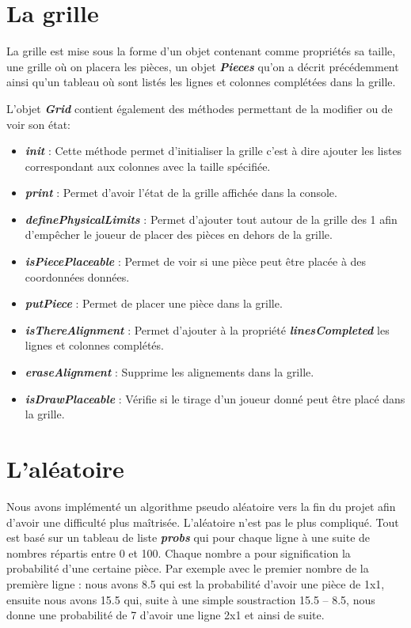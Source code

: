 \documentclass[a4paper]{report}
\begin{document}
\section{La grille}
La grille est mise sous la forme d'un objet contenant comme propriétés sa taille, une grille où on placera les pièces, un objet \textbf{\textit{Pieces}} qu'on a décrit précédemment ainsi qu'un tableau où sont listés les lignes et colonnes complétées dans la grille.

L'objet \textbf{\textit{Grid}} contient également des méthodes permettant de la modifier ou de voir son état:
\begin{itemize}
	\item \textbf{\textit{init}} : Cette méthode permet d'initialiser la grille c'est à dire ajouter les listes correspondant aux colonnes avec la taille spécifiée.
	\item \textbf{\textit{print}} : Permet d'avoir l'état de la grille affichée dans la console.
	\item \textbf{\textit{definePhysicalLimits}} : Permet d'ajouter tout autour de la grille des 1 afin d'empêcher le joueur de placer des pièces en dehors de la grille.
	\item \textbf{\textit{isPiecePlaceable}} : Permet de voir si une pièce peut être placée à des coordonnées données.
	\item \textbf{\textit{putPiece}} : Permet de placer une pièce dans la grille.
	\item \textbf{\textit{isThereAlignment}} : Permet d'ajouter à la propriété \textbf{\textit{linesCompleted}} les lignes et colonnes complétés.
	\item \textbf{\textit{eraseAlignment}} : Supprime les alignements dans la grille.
	\item \textbf{\textit{isDrawPlaceable}} : Vérifie si le tirage d'un joueur donné peut être placé dans la grille.
\end{itemize}

\section{L'aléatoire}
Nous avons implémenté un algorithme pseudo aléatoire vers la fin du projet afin d'avoir une difficulté plus maîtrisée. L'aléatoire n'est pas le plus compliqué. Tout est basé sur un tableau de liste \textbf{\textit{probs}} qui pour chaque ligne à une suite de nombres répartis entre 0 et 100. Chaque nombre a pour signification la probabilité d'une certaine pièce. Par exemple avec le premier nombre de la première ligne : nous avons 8.5 qui est la probabilité d'avoir une pièce de 1x1, ensuite nous avons 15.5 qui, suite à une simple soustraction 15.5 – 8.5, nous donne une probabilité de 7 d'avoir une ligne 2x1 et ainsi de suite. \\
\end{document}
